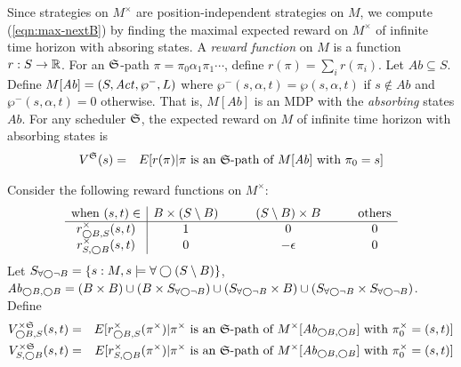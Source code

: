 
Since strategies on $M^{\times}$ are position-independent strategies
on $M$, we compute (\ref{eqn:max-nextB}) by finding the maximal
expected reward on $M^{\times}$ of infinite time horizon with absoring
states. A \emph{reward function} on $M$ is a function $r : S
\rightarrow \mathbb{R}$. For an $\mathfrak{S}$-path $\pi = \pi_0 \alpha_1 \pi_1
\cdots$, define $r (\pi) = \sum_i r (\pi_i)$.
Let $\mathit{Ab} \subseteq S$. Define $M[\mathit{Ab}] = (S, \mathit{Act},
\wp^-, L)$ where $\wp^- (s, \alpha, t) = \wp (s, \alpha, t)$ if $s
\not\in \mathit{Ab}$ and $\wp^- (s, \alpha, t) = 0$ otherwise. That
is, $M[\mathit{Ab}]$ is an MDP with the \emph{absorbing} states
$\mathit{Ab}$. 
For any scheduler $\mathfrak{S}$, the expected reward on $M$ of
infinite time horizon with absorbing states is
\begin{eqnarray*}
{V}^{\mathfrak{S}} (s) & = & 
E[ {r} (\pi) | \pi
\textmd{ is an $\mathfrak{S}$-path of } M[\mathit{Ab}]
\textmd{ with } \pi_0 = s ]
\end{eqnarray*}

Consider the following reward functions on $M^{\times}$:
\[
\begin{array}{c|ccccc}
  \textmd{when } (s, t) \in 
  & B \times (S \setminus B)
  & \hspace{1em}
  & (S \setminus B) \times B
  & \hspace{1em}
  & \textmd{others}\\
  \hline
  {r}_{\bigcirc B, S}^{\times} (s, t) & 1 && 0 && 0\\
  {r}_{S, \bigcirc B}^{\times} (s, t) & 0 && -\epsilon && 0\\
\end{array}
\]
Let $S_{\forall \bigcirc \neg B} = \{ s : M, s \models \forall \bigcirc (S \setminus
B) \}$, $\mathit{Ab}_{\bigcirc B, \bigcirc B} = (B
\times B) \cup (B \times S_{\forall \bigcirc \neg B}) \cup (S_{\forall \bigcirc \neg B} \times B)
\cup (S_{\forall \bigcirc \neg B} \times S_{\forall \bigcirc \neg B})$.
Define
\begin{eqnarray*}
  {V}_{\bigcirc B, S}^{\times \mathfrak{S}} (s, t) & = &
  E[ {r}_{\bigcirc B, S}^{\times} (\pi^{\times}) | \pi^{\times} \textmd{ is an
  $\mathfrak{S}$-path of } M^{\times}[\mathit{Ab}_{\bigcirc B, \bigcirc B}]
  \textmd{ with } \pi_0^{\times} = (s, t) ]\\
  {V}_{S, \bigcirc B}^{\times \mathfrak{S}} (s, t) & = &
  E[ {r}_{S, \bigcirc B}^{\times} (\pi^{\times}) | \pi^{\times} \textmd{ is an
  $\mathfrak{S}$-path of } M^{\times}[\mathit{Ab}_{\bigcirc B, \bigcirc B}] 
  \textmd{ with } \pi_0^{\times} = (s, t) ]
\end{eqnarray*}

